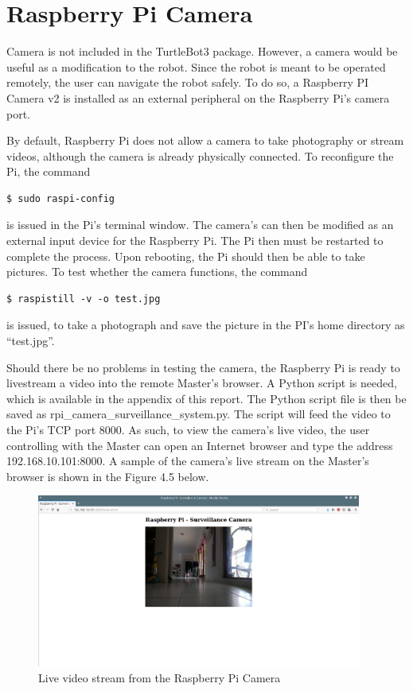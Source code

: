 \documentclass[12pt]{report}
\begin{document}
\section{Raspberry Pi Camera}
Camera is not included in the TurtleBot3 package. However, a camera would be useful as a modification to the robot. Since the robot is meant to be operated remotely, the user can navigate the robot safely. To do so, a Raspberry PI Camera v2 is installed as an external peripheral on the Raspberry Pi’s camera port.\par
\vspace{1em}
By default, Raspberry Pi does not allow a camera to take photography or stream videos, although the camera is already physically connected. To reconfigure the Pi, the command
\begin{verbatim}
$ sudo raspi-config

\end{verbatim}
is issued in the Pi’s terminal window. The camera’s can then be modified as an external input device for the Raspberry Pi. The Pi then must be restarted to complete the process. Upon rebooting, the Pi should then be able to take pictures. To test whether the camera functions, the command 
\begin{verbatim}
$ raspistill -v -o test.jpg

\end{verbatim} 
is issued, to take a photograph and save the picture in the PI’s home directory as “test.jpg”.\par
\vspace{1em}
Should there be no problems in testing the camera, the Raspberry Pi is ready to livestream a video into the remote Master’s browser. A Python script is needed, which is available in the appendix of this report. The Python script file is then be saved as rpi\_camera\_surveillance\_system.py. The script will feed the video to the Pi’s TCP port 8000. As such, to view the camera’s live video, the user controlling with the Master can open an Internet browser and type the address 192.168.10.101:8000. A sample of the camera’s live stream on the Master’s browser is shown in the Figure 4.5 below.
\begin{figure}[H]
        \centering
        \includegraphics[width=0.95\textwidth]{Fig7.png}
        \caption{Live video stream from the Raspberry Pi Camera}
        \label{fig:7}
    \end{figure}
\end{document}
